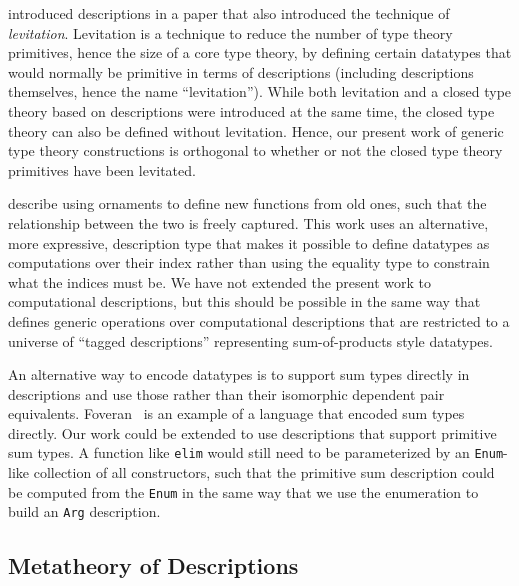 \documentclass[nonatbib]{sigplanconf}
\begin{document}
\citet{Chapman:2010:GAL:1932681.1863547} introduced descriptions in a
paper that also introduced the technique of {\it levitation}.
Levitation is a technique to reduce the number of type theory
primitives, hence the size of a core type theory, by defining certain
datatypes that would normally be primitive in terms of descriptions
(including descriptions themselves, hence the name ``levitation'').
While both levitation and a closed type theory based on descriptions
were introduced at the same time, the closed type theory can also be
defined without levitation. Hence, our present work of generic type
theory constructions is orthogonal to whether or not the closed type
theory primitives have been levitated.

\citet{dagand2012transporting} describe using ornaments
to define new functions from old ones, such that the
relationship between the two is freely captured.
This work uses an alternative, more expressive, description
type that makes it possible to define datatypes as computations over
their index rather than using the equality type to constrain what the
indices must be. We have not extended the present work to
computational descriptions, but this should be possible in the same
way that \citet{dagand:phd} defines generic operations over
computational descriptions that are restricted to a universe of
``tagged descriptions'' representing sum-of-products style datatypes.

An alternative way to encode datatypes is to
support sum types directly in descriptions and use those rather than
their isomorphic dependent pair equivalents. Foveran~\citep{foveran} is
an example of a language that encoded sum types directly. Our work
could be extended to use descriptions that support primitive sum
types. A function like {\tt elim} would still need to be parameterized
by an {\tt Enum}-like collection of all constructors, such that the
primitive sum description could be computed from the {\tt Enum} in the
same way that we use the enumeration to build an {\tt Arg}
description.

\subsection{Metatheory of Descriptions}
\end{document}
